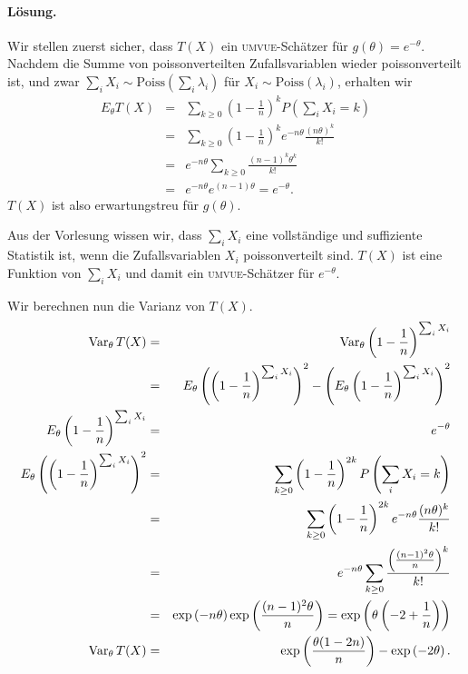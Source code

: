 \paragraph*{Lösung. } Wir stellen zuerst sicher, dass $T(X)$ ein
\textsc{umvue}-Schätzer für $g(\theta)=e^{-\theta}$. Nachdem die Summe von
poissonverteilten Zufallsvariablen wieder poissonverteilt ist, und zwar
$\sum_{i}^{} X_i \sim \textrm{Poiss}(\sum_{i}^{} \lambda_i)$ für $X_i \sim
\textrm{Poiss}(\lambda_i)$, erhalten wir
\begin{eqnarray*}
    E_\theta T(X) &=& \sum_{k\geq 0} \left( 1-\frac{1}{n} \right)^k P\left( \sum_{i}^{} X_i =k \right)\\
    &=& \sum_{k\geq 0}^{} \left( 1-\frac{1}{n} \right)^k e^{-n\theta} \frac{(n\theta)^k}{k!} \\
    &=& e^{-n\theta} \sum_{k\geq 0} \frac{ (n-1)^k\theta^k}{k!} \\
    &=& e^{-n \theta} e^{(n-1)\theta} = e^{-\theta}.
\end{eqnarray*}
$T(X)$ ist also erwartungstreu für $g(\theta)$.

Aus der Vorlesung wissen wir, dass $\sum_{i}^{} X_i$ eine vollständige und suffiziente
Statistik ist, wenn die Zufallsvariablen $X_i$ poissonverteilt sind. $T(X)$ ist 
eine Funktion von $\sum_{i}^{} X_i$ und damit ein \textsc{umvue}-Schätzer
für $e^{-\theta}$.

Wir berechnen nun die Varianz von $T(X)$.
\begin{eqnarray*}
    \operatorname{Var}_\theta T(X)&=& \operatorname{Var}_\theta \left( 1-\frac{1}{n} \right)^{\sum_{i} X_i} \\ 
    &=& E_\theta \left( \left( 1-\frac{1}{n} \right)^{\sum_{i} X_i} \right)^2 - \left( E_\theta \left( 1-\frac{1}{n} \right)^{\sum_{i} X_i} \right)^2 \\
    E_\theta \left( 1-\frac{1}{n} \right)^{\sum_{i} X_i} &=& e^{-\theta} \\
    E_\theta \left( \left( 1-\frac{1}{n} \right)^{\sum_{i} X_i} \right)^2 
    &=& \sum_{k\geq 0}^{} \left( 1-\frac{1}{n} \right)^{2k} P\left( \sum_{i}^{} X_i =k \right) \\
    &=& \sum_{k\geq 0}^{} \left( 1-\frac{1}{n} \right)^{2k} e^{-n\theta} \frac{(n\theta)^k}{k!} \\
    &=& e^{-n \theta} \sum_{k\geq 0} \frac{ \left( \frac{ (n-1)^2 \theta }{n} \right)^k   }{k!} \\
    &=& \exp\left( -n\theta \right) \exp\left( \frac{(n-1)^2\theta}{n} \right)
    = \exp\left( \theta\left( -2 + \frac{1}{n} \right) \right) \\
    \operatorname{Var}_\theta T(X) &=& \exp\left( \frac{\theta(1-2n)}{n} \right) - \exp\left( -2\theta \right). 
\end{eqnarray*}

